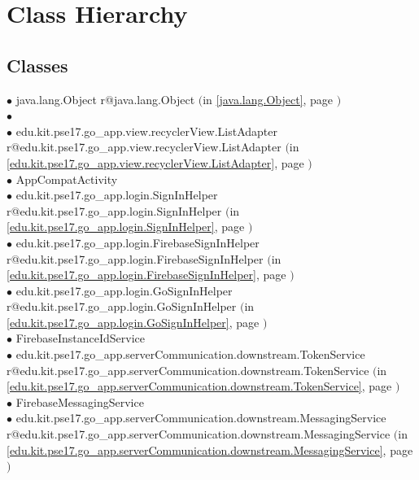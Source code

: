 \documentclass[11pt,a4paper]{report}
\makeatletter
\newcommand{\refdefined}[1]{
\expandafter\ifx\csname r@#1\endcsname\relax
\relax\else
{$($in \ref{#1}, page \pageref{#1}$)$}\fi}
\makeatother
\begin{document}
\section*{Class Hierarchy}{
\thispagestyle{empty}
\subsection*{Classes}
{\raggedright
\hspace{0.0cm} $\bullet$ java.lang.Object {\tiny \refdefined{java.lang.Object}} \\
\hspace{1.0cm} $\bullet$  {\tiny } \\
\hspace{2.0cm} $\bullet$ edu.kit.pse17.go\_app.view.recyclerView.ListAdapter {\tiny \refdefined{edu.kit.pse17.go_app.view.recyclerView.ListAdapter}} \\
\hspace{1.0cm} $\bullet$ AppCompatActivity {\tiny } \\
\hspace{2.0cm} $\bullet$ edu.kit.pse17.go\_app.login.SignInHelper {\tiny \refdefined{edu.kit.pse17.go_app.login.SignInHelper}} \\
\hspace{3.0cm} $\bullet$ edu.kit.pse17.go\_app.login.FirebaseSignInHelper {\tiny \refdefined{edu.kit.pse17.go_app.login.FirebaseSignInHelper}} \\
\hspace{3.0cm} $\bullet$ edu.kit.pse17.go\_app.login.GoSignInHelper {\tiny \refdefined{edu.kit.pse17.go_app.login.GoSignInHelper}} \\
\hspace{1.0cm} $\bullet$ FirebaseInstanceIdService {\tiny } \\
\hspace{2.0cm} $\bullet$ edu.kit.pse17.go\_app.serverCommunication.downstream.TokenService {\tiny \refdefined{edu.kit.pse17.go_app.serverCommunication.downstream.TokenService}} \\
\hspace{1.0cm} $\bullet$ FirebaseMessagingService {\tiny } \\
\hspace{2.0cm} $\bullet$ edu.kit.pse17.go\_app.serverCommunication.downstream.MessagingService {\tiny \refdefined{edu.kit.pse17.go_app.serverCommunication.downstream.MessagingService}} \\
}}
\end{document}
